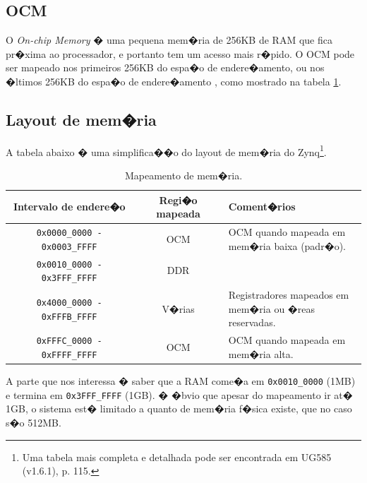 \documentclass{ufscThesis/ufscThesis} %
\begin{document}
\subsection{OCM} O \emph{On-chip Memory} � uma pequena mem�ria de 256KB de RAM que fica pr�xima ao processador, e portanto tem um acesso mais r�pido. O OCM pode ser mapeado nos primeiros 256KB do espa�o de endere�amento, ou nos �ltimos 256KB do espa�o de endere�amento \cite{ug585}, como mostrado na tabela \ref{tab.memlayout}.


\subsection{Layout de mem�ria} 
A tabela abaixo � uma simplifica��o do layout de mem�ria do Zynq\footnote{Uma tabela mais completa e detalhada pode ser encontrada em UG585 (v1.6.1), p. 115.}.

\begin{table}[ht]

\centering
\begin{tabular}{ccp{5cm}}
\hline\hline                        %
Intervalo de endere�o  & Regi�o mapeada & Coment�rios\\ [0.5ex] %
\hline                  %
\verb+0x0000_0000 - 0x0003_FFFF+ & OCM & \parbox{5cm}{OCM quando mapeada em \\mem�ria baixa (padr�o).} \\
\verb+0x0010_0000 - 0x3FFF_FFFF+ & DDR &  \\
\verb+0x4000_0000 - 0xFFFB_FFFF+ & V�rias & \parbox{5cm}{Registradores mapeados em \\mem�ria ou �reas reservadas.} \\
\verb+0xFFFC_0000 - 0xFFFF_FFFF+ & OCM & \parbox{5cm}{OCM quando mapeada em \\mem�ria alta.}\\ [1ex]
\hline %
\end{tabular}
\caption{Mapeamento de mem�ria.}
\label{tab.memlayout} %
\end{table}

A parte que nos interessa � saber que a RAM come�a em \verb+0x0010_0000+ (1MB) e termina em \verb+0x3FFF_FFFF+ (1GB). � �bvio que apesar do mapeamento ir at� 1GB, o sistema est� limitado a quanto de mem�ria f�sica existe, que no caso s�o 512MB.
\end{document}
